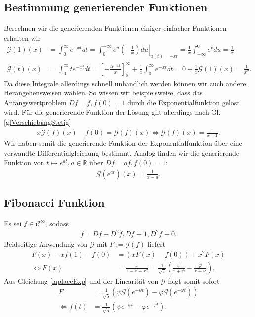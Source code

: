 \documentclass[a4paper,11pt]{article}
\theoremstyle{mytheor}
\newcommand{\R}[0]{\mathbb{R}}
\begin{document}
\subsection*{Bestimmung generierender Funktionen}

Berechnen wir die generierenden Funktionen einiger einfacher Funktionen erhalten wir
\begin{align*}
    \mathcal{G}(1)(x) & = \int_0^\infty e^{-xt} dt = \left. \int_0^{-\infty} e^u  \left(-\frac{1}{x}\right) du \right\vert_{u(t)=-xt} = \frac{1}{x} \int_{-\infty}^0 e^u du = \frac{1}{x}     \\
    \mathcal{G}(t)(x) & = \int_0^\infty t e^{-xt} dt = \left[-\frac{t e^{-xt}}{x}\right]_0^\infty + \frac{1}{x} \int_0^\infty e^{-xt} dt = 0 + \frac{1}{x} \mathcal{G}(1)(x) = \frac{1}{x^2}.
\end{align*}
Da diese Integrale allerdings schnell unhandlich werden können wir auch andere Herangehensweisen wählen. So wissen wir beispielsweise, dass das Anfangswertproblem $Df = f, f(0) = 1$ durch die Exponentialfunktion gelöst wird. Für die generierende Funktion der Lösung gilt allerdings nach Gl. \ref{gfVerschiebungStetig}
\begin{align*}
    x\mathcal{G}(f)(x) - f(0) = \mathcal{G}(f)(x) \iff \mathcal{G}(f)(x) = \frac{1}{x-1}.
\end{align*}
Wir haben somit die generierende Funktion  der Exponentialfunktion über eine verwandte Differentialgleichung bestimmt.
Analog finden wir die generierende Funktion von $t \mapsto e^{at}, a \in \R$ über $Df = a f, f(0) = 1$:
\begin{align}
    \mathcal{G}(e^{at})(x) = \frac{1}{x-a}. \label{laplaceExp}
\end{align}

\subsection*{Fibonacci Funktion}

Es sei $f \in  \mathcal{C}^\infty$, sodass
\begin{align*}
    f = Df + D^2f, Df \equiv 1, D^2f \equiv 0.
\end{align*}
Beidseitige Anwendung von $\mathcal{G}$ mit $F := \mathcal{G}(f)$ liefert
\begin{align*}
    F(x) - xf(1) - f(0) & = (xF(x) - f(0)) + x^2F(x)                                                                                   \\
    \iff F(x)           & = \frac{x}{1 - x - x^2} = \frac{1}{\sqrt{5}} \left( \frac{\psi}{x+\psi} - \frac{\varphi}{x+\varphi} \right).
\end{align*}
Aus Gleichung \ref{laplaceExp} und der Linearität von $\mathcal{G}$ folgt somit sofort
\begin{align*}
    F         & = \frac{1}{\sqrt{5}} (\psi \mathcal{G}(e^{-\psi t}) - \varphi \mathcal{G}(e^{-\varphi t})) \\
    \iff f(t) & = \frac{1}{\sqrt{5}}(\psi e^{-\psi t} - \varphi e^{-\varphi t}).
\end{align*}
\end{document}
